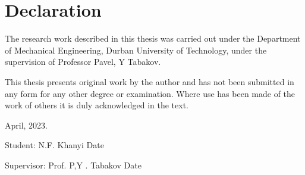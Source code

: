 \chapter{Declaration}
The research work described in this thesis was carried out under the Department of Mechanical Engineering, Durban University of Technology, under the supervision of Professor Pavel, Y Tabakov.   

\noindent This thesis presents original work by the author and has not been submitted in any form for any other degree or examination. Where use has been made of the work of others it is duly acknowledged in the text. \newline

\begin{flushright}
April, 2023.
\end{flushright} 

Student:
N.F. Khanyi	Date

Supervisor:
Prof. P,Y . Tabakov Date